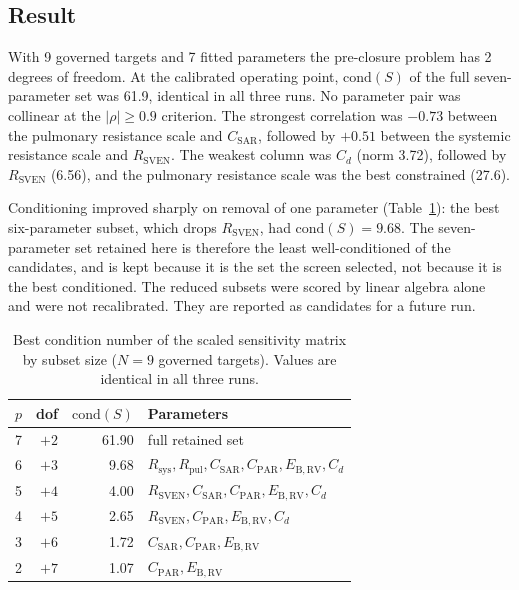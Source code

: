 \documentclass{article}
\begin{document}
\subsection{Result}
With 9 governed targets and 7 fitted parameters the pre-closure problem has 2 degrees of freedom. At the calibrated operating point, $\mathrm{cond}(S)$ of the full seven-parameter set was 61.9, identical in all three runs. No parameter pair was collinear at the $|\rho| \ge 0.9$ criterion. The strongest correlation was $-0.73$ between the pulmonary resistance scale and $C_{\mathrm{SAR}}$, followed by $+0.51$ between the systemic resistance scale and $R_{\mathrm{SVEN}}$. The weakest column was $C_d$ (norm 3.72), followed by $R_{\mathrm{SVEN}}$ (6.56), and the pulmonary resistance scale was the best constrained (27.6).

Conditioning improved sharply on removal of one parameter (Table~\ref{tab:S-cond}): the best six-parameter subset, which drops $R_{\mathrm{SVEN}}$, had $\mathrm{cond}(S) = 9.68$. The seven-parameter set retained here is therefore the least well-conditioned of the candidates, and is kept because it is the set the screen selected, not because it is the best conditioned. The reduced subsets were scored by linear algebra alone and were not recalibrated. They are reported as candidates for a future run.

\begin{table}[H]
\centering\small
\caption{Best condition number of the scaled sensitivity matrix by subset size ($N = 9$ governed targets). Values are identical in all three runs.}
\label{tab:S-cond}
\begin{tabular}{rrrl}
\toprule
$p$ & dof & $\mathrm{cond}(S)$ & \textbf{Parameters} \\
\midrule
7 & $+2$ & 61.90 & full retained set \\
6 & $+3$ & 9.68 & $R_{\mathrm{sys}}, R_{\mathrm{pul}}, C_{\mathrm{SAR}}, C_{\mathrm{PAR}}, E_{\mathrm{B,RV}}, C_d$ \\
5 & $+4$ & 4.00 & $R_{\mathrm{SVEN}}, C_{\mathrm{SAR}}, C_{\mathrm{PAR}}, E_{\mathrm{B,RV}}, C_d$ \\
4 & $+5$ & 2.65 & $R_{\mathrm{SVEN}}, C_{\mathrm{PAR}}, E_{\mathrm{B,RV}}, C_d$ \\
3 & $+6$ & 1.72 & $C_{\mathrm{SAR}}, C_{\mathrm{PAR}}, E_{\mathrm{B,RV}}$ \\
2 & $+7$ & 1.07 & $C_{\mathrm{PAR}}, E_{\mathrm{B,RV}}$ \\
\bottomrule
\end{tabular}
\end{table}
\end{document}
